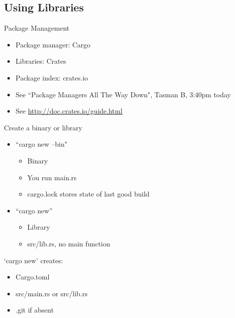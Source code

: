 \documentclass[50pt]{beamer}
\begin{document}
\subsection{Using Libraries}

    \begin{frame}
        Package Management
        \begin{itemize}
            \item Package manager: Cargo
            \item Libraries: Crates
            \item Package index: crates.io
            \item See ``Package Managers All The Way Down", Tasman B, 3:40pm today
            \item See \url{http://doc.crates.io/guide.html}
        \end{itemize}
    \end{frame}

    \begin{frame}
        Create a binary or library
        \begin{itemize}
            \item ``cargo new --bin"
                \begin{itemize}
                    \item Binary
                    \item You run main.rs
                    \item cargo.lock stores state of last good build
                \end{itemize}
            \item ``cargo new''
                \begin{itemize}
                    \item Library
                    \item src/lib.rs, no main function
                \end{itemize}
        \end{itemize}
    \end{frame}

    \begin{frame}
        `cargo new' creates:
        \begin{itemize}
            \item Cargo.toml
            \item src/main.rs or src/lib.rs
            \item .git if absent
        \end{itemize}
    \end{frame}
\end{document}
